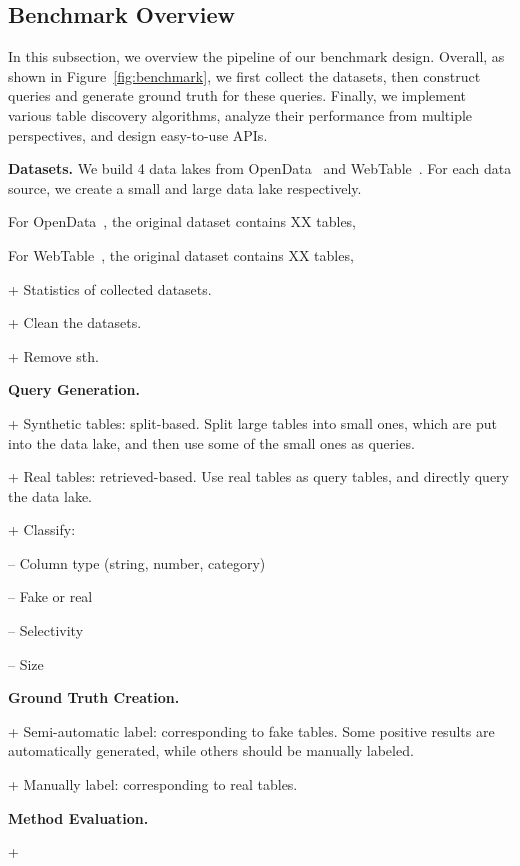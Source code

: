 \subsection{Benchmark Overview}
In this subsection, we overview the pipeline of our benchmark design. Overall, as shown in Figure~\ref{fig:benchmark}, we first collect the datasets, then construct queries and generate ground truth for these queries. Finally, we implement various table discovery algorithms, analyze their performance from multiple perspectives, and design easy-to-use APIs.

\noindent\textbf{Datasets.}
We build 4 data lakes from OpenData~\cite{OpenData} and WebTable~\cite{WebTable}. For each data source, we create a small and large data lake respectively.

For OpenData~\cite{OpenData}, the original dataset contains XX tables, 

For WebTable~\cite{WebTable}, the original dataset contains XX tables, 


+ Statistics of collected datasets.

+ Clean the datasets.

+ Remove sth.



\noindent\textbf{Query Generation.}

+ Synthetic tables: split-based. Split large tables into small ones, which are put into the data lake, and then use some of the small ones as queries.

+ Real tables: retrieved-based. Use real tables as query tables, and directly query the data lake.


+ Classify: 

\quad\quad -- Column type (string, number, category)
 
\quad\quad -- Fake or real
  
\quad\quad -- Selectivity

\quad\quad -- Size

\noindent\textbf{Ground Truth Creation.}

+ Semi-automatic label: corresponding to fake tables. Some positive results are automatically generated, while others should be manually labeled.

+ Manually label: corresponding to real tables.

\noindent\textbf{Method Evaluation.} 

+ 

